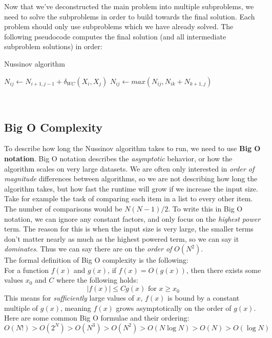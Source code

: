 \documentclass[12pt]{article}
\begin{document}
Now that we've deconstructed the main problem into multiple subproblems, we need to solve the subproblems in order to build towards the final solution. Each problem should only use subproblems which we have already solved. 
The following pseudocode computes the final solution (and all intermediate subproblem solutions) in order:
\begin{algorithm}
\caption{Nussinov algorithm}
\begin{algorithmic}
        \State $N_{ij} \leftarrow N_{i+1, j-1} + \delta_{WC}\left(X_i, X_j\right)$
            \State $N_{ij}\leftarrow max\left(N_{ij}, N_{ik}+N_{k+1, j}\right)$
        \EndFor
    \EndFor
\EndFor
\end{algorithmic}
\end{algorithm}\\
\subsection{Big O Complexity}
To describe how long the Nussinov algorithm takes to run, we need to use \textbf{Big O notation}. Big O notation describes the \textit{asymptotic} behavior, or how the algorithm scales on very large datasets. We are often only interested in \textit{order of magnitude} differences between algorithms, so we are not describing how long the algorithm takes, but how fast the runtime will grow if we increase the input size.\\[10pt]
Take for example the task of comparing each item in a list to every other item. The number of comparisons would be $N(N-1)/2$. To write this in Big O notation, we can ignore any constant factors, and only focus on the \textit{highest power} term. The reason for this is when the input size is very large, the smaller terms don't matter nearly as much as the highest powered term, so we can say it \textit{dominates}. Thus we can say there are on the \textit{order of} $O(N^2)$.\\[10pt]
The formal definition of Big O complexity is the following:\\
For a function $f(x)$ and $g(x)$, if $f(x) = O(g(x))$, then there exists some values $x_0$ and $C$ where the following holds:
$$|f(x)| \leq Cg(x) \text{ for } x\geq x_0$$
This means for \textit{sufficiently} large values of $x$, $f(x)$ is bound by a constant multiple of $g(x)$, meaning $f(x)$ grows asymptotically on the order of $g(x)$.\\[10pt]
Here are some common Big O formulae and their ordering:
$$O(N!) > O(2^N) > O(N^3) > O(N^2) > O(N\log N) > O(N) > O(\log N)$$
\end{document}
